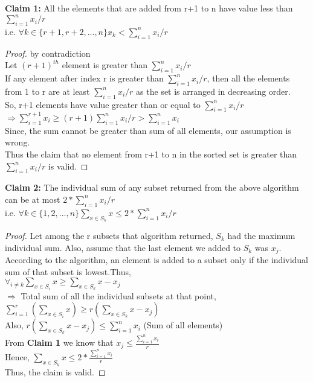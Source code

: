 \documentclass[11pt]{article}
\begin{document}
\begin{enumerate}
    \textbf{Claim 1:} All the elements that are added from r+1 to n have value less than $\sum_{i=1}^n x_i/r$\\
    i.e. $\forall k \in \{r+1,r+2,...,n\} x_k < \sum_{i=1}^n x_i/r$
    \begin{proof} by contradiction \\
    Let $(r+1)^{th}$ element is greater than $\sum_{i=1}^n x_i/r$\\
    If any element after index r is greater than $\sum_{i=1}^n x_i/r$, then all the elements from 1 to r are at least $\sum_{i=1}^n x_i/r$ as the set is arranged in decreasing order.\\
    So, r+1 elements have value greater than or equal to $\sum_{i=1}^n x_i/r$\\
    $\Longrightarrow \sum_{i=1}^{r+1} x_i \geq (r+1)\sum_{i=1}^n x_i/r > \sum_{i=1}^n x_i$ \\
    Since, the sum cannot be greater than sum of all elements, our assumption is wrong.\\
    Thus the claim that no element from r+1 to n in the sorted set is greater than $\sum_{i=1}^n x_i/r$ is valid.
    \end{proof}
    \textbf{Claim 2:} The individual sum of any subset returned from the above algorithm can be at most $2* \sum_{i=1}^n x_i/r$ \\ i.e. $\forall k \in \{1,2,...,n\} \sum_{x \in S_k} x \leq 2* \sum_{i=1}^n x_i/r$
    \begin{proof}
     Let among the r subsets that algorithm returned, $S_k$ had the maximum individual sum. Also, assume that the last element we added to $S_k$ was $x_j$.\\
     According to the algorithm, an element is added to a subset only if the individual sum of that subset is lowest.Thus, \\
     $\forall_{i \neq k} \sum_{x \in S_i} x \geq \sum_{x \in S_k} x - x_j$ \\
     $\Longrightarrow$ Total sum of all the individual subsets at that point, $\sum_{i=1}^r (\sum_{x \in S_i} x) \geq r(\sum_{x \in S_k} x - x_j)$ \\
     Also, $r(\sum_{x \in S_k} x - x_j) \leq \sum_{i=1}^n x_i$ (Sum of all elements)\\
     From \textbf{Claim 1} we know that $x_j \leq \frac{\sum_{i=1}^n x_i}{r}$ \\
     Hence, $\sum_{x \in S_k} x \leq 2*\frac{\sum_{i=1}^n x_i}{r}$ \\
     Thus, the claim is valid.
    \end{proof}

\end{enumerate}
\end{document}
